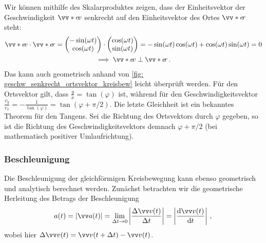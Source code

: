 Wir können mithilfe des Skalarproduktes zeigen, dass der Einheitsvektor der Geschwindigkeit $\ivecS{e}{v}$ senkrecht auf den Einheitsvektor des Ortes $\ivecS{e}{r}$ steht:
\begin{gather*}
    \ivecS{e}{v} \cdot \ivecS{e}{r} = \icolTwo{-\sin(\omega t)}{\cos(\omega t)} \cdot \icolTwo{\cos(\omega t)}{\sin(\omega t)} = -\sin(\omega t)\cos(\omega t) + \cos(\omega t)\sin(\omega t) = 0 \\
    \implies  \ivecS{e}{v} \perp \ivecS{e}{r} \mDot
\end{gather*}
Das kann auch geometrisch anhand von \cref{fig: geschw_senkrecht_ortsvektor_kreisbew} leicht überprüft werden. Für den Ortsvektor gilt, dass $\frac{y}{x} = \tan(\varphi)$ ist, während für den Geschwindigkeitsvektor $\frac{v_y}{v_x} = -\frac{1}{\tan(\varphi)} = \tan(\varphi + \pi/2)$. Die letzte Gleichheit ist ein bekanntes Theorem für den Tangens. Sei die Richtung des Ortsvektors durch $\varphi$ gegeben, so ist die Richtung des Geschwindigkeitsvektors demnach $\varphi + \pi/2$ (bei mathematisch positiver Umlaufrichtung).  


\subsubsection{Beschleunigung}\label{subsubsec: beschleunigung_gleichf_kreisbew}
Die Beschleunigung der gleichförmigen Kreisbewegung kann ebenso geometrisch und analytisch berechnet werden. Zunächst betrachten wir die geometrische Herleitung des Betrags der Beschleunigung 
\begin{equation}
    a(t) = |\ivec{a}(t)| =  \lim_{\Delta t \to 0} \left|\frac{\Delta \ivec{v}(t)}{\Delta t} \right| = \left| \frac{\dd \ivec{v}(t)}{\dd t} \right| \mComma
\end{equation}
wobei hier $\Delta \ivec{v}(t) = \ivec{v}(t+\Delta t) - \ivec{v}(t)$.
